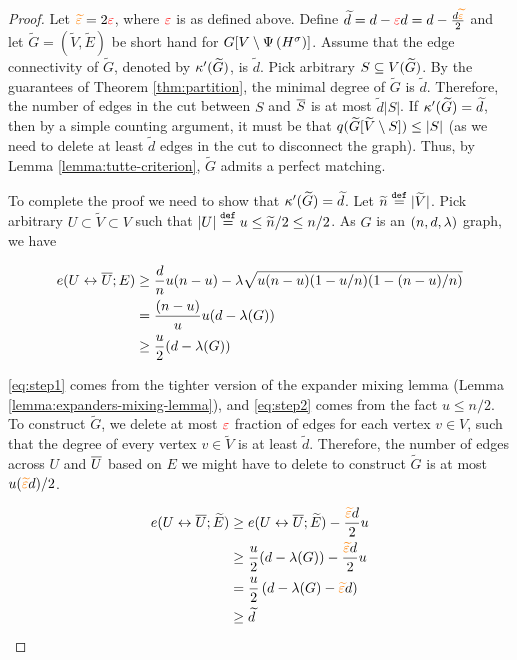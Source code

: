 \documentclass[11pt]{article}
\begin{document}
\begin{proof}
Let $\textcolor{orange}{\widetilde{\varepsilon}} = 2\textcolor{red}{\varepsilon}$, where $\textcolor{red}{\varepsilon}$ is as defined above.
Define $\widetilde{d} = d - \textcolor{red}{\varepsilon} d =d - \frac{d\textcolor{orange}{\widetilde{\varepsilon}}}{2}$ and let $\tilde{G}=(\tilde{V}, \tilde{E})$ be short hand for $G[V \setminus \Psi\left({H}^{\sigma}\right)]$.
Assume that the edge connectivity of $\tilde{G}$, denoted by $\kappa'(\widetilde{G})$, is $\tilde{d}$. 
Pick arbitrary $S \subseteq V(\widetilde{G})$.
By the guarantees of Theorem \ref{thm:partition}, the minimal degree of $\tilde{G}$ is $\tilde{d}$. 
Therefore, the number of edges in the cut between $S$ and $\overline{S}$ is at most $\tilde{d}|S|$.
If $\kappa'(\widetilde{G}) = \widetilde{d}$, then by a simple counting argument, it must be that $q(\widetilde{G}[\widetilde{V} \setminus S]) \leq |S|$ (as we need to delete  at least $\tilde{d}$ edges in the cut to disconnect the graph).
Thus, by Lemma \ref{lemma:tutte-criterion}, $\tilde{G}$ admits a perfect matching.

To complete the proof we need to show that $\kappa'(\widetilde{G}) = \widetilde{d}$.
Let $\widetilde{n} \text{}\overset{\mathtt{def}}{=} |\widetilde{V}|$.
Pick arbitrary $U \subset \tilde{V} \subset V$ such that $|U| \text{}\overset{\mathtt{def}}{=} u \leq \widetilde{n}/2 \leq n/2$.
As $G$ is an $(n, d, \lambda)$ graph, we have

\begin{align}
e(U \leftrightarrow \overline{U}; E) &\geq 	\frac{d}{n}u(n-u) - \lambda\sqrt{u(n-u)(1 - u/n)(1- (n-u)/n)} \label{eq:step1}\\
&= \frac{(n-u)}{u}u(d - \lambda(G)) \label{eq:step2}\\
&\geq \frac{u}{2}(d - \lambda(G))
\end{align}

\eqref{eq:step1} comes from the tighter version of the expander mixing lemma (Lemma \ref{lemma:expanders-mixing-lemma}), and 
\eqref{eq:step2} comes from the fact $u \leq n/2$.
To construct $\tilde{G}$, we delete at most $\textcolor{red}{\varepsilon}$ fraction of edges for each vertex $v \in V$, such that the degree of every vertex $v \in \tilde{V}$ is at least $\tilde{d}$.
Therefore, the number of edges across $U$ and $\overline{U}$ based on $E$ we might have to delete to construct $\tilde{G}$ is at most $u(\textcolor{orange}{\widetilde{\varepsilon}} d)/2$.

\begin{align}
	e(U \leftrightarrow \overline{U}; \widetilde{E}) &\geq 	e(U \leftrightarrow \overline{U}; \widetilde{E}) - \frac{\textcolor{orange}{\widetilde{\varepsilon}} d}{2} u \\
&\geq \frac{u}{2}(d - \lambda(G)) - \frac{\textcolor{orange}{\widetilde{\varepsilon}} d}{2} u \\
&= \frac{u}{2}\left(d - \lambda(G) - \textcolor{orange}{\widetilde{\varepsilon}} d\right) \label{eq:lambda-assumption} \\
&\geq \widetilde{d}
\end{align}



\end{proof}
\end{document}
